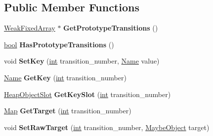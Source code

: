 \subsection*{Public Member Functions}
\begin{DoxyCompactItemize}
\item 
\mbox{\label{classv8_1_1internal_1_1TransitionArray_afcbf45c0f6c2a1c6b2a48971aad26eb3}} 
\mbox{\hyperlink{classv8_1_1internal_1_1WeakFixedArray}{Weak\+Fixed\+Array}} $\ast$ {\bfseries Get\+Prototype\+Transitions} ()
\item 
\mbox{\label{classv8_1_1internal_1_1TransitionArray_a60cda26d8a93728ff533ddd300ddc4d1}} 
\mbox{\hyperlink{classbool}{bool}} {\bfseries Has\+Prototype\+Transitions} ()
\item 
\mbox{\label{classv8_1_1internal_1_1TransitionArray_acc3e8763c63c29defd0416bc5c1ee091}} 
void {\bfseries Set\+Key} (\mbox{\hyperlink{classint}{int}} transition\+\_\+number, \mbox{\hyperlink{classv8_1_1internal_1_1Name}{Name}} value)
\item 
\mbox{\label{classv8_1_1internal_1_1TransitionArray_a8ce3e0c049ca13071923b592d588ba9b}} 
\mbox{\hyperlink{classv8_1_1internal_1_1Name}{Name}} {\bfseries Get\+Key} (\mbox{\hyperlink{classint}{int}} transition\+\_\+number)
\item 
\mbox{\label{classv8_1_1internal_1_1TransitionArray_a90202287bcd6a5cfbe62bc2b29fd39ba}} 
\mbox{\hyperlink{classv8_1_1internal_1_1HeapObjectSlot}{Heap\+Object\+Slot}} {\bfseries Get\+Key\+Slot} (\mbox{\hyperlink{classint}{int}} transition\+\_\+number)
\item 
\mbox{\label{classv8_1_1internal_1_1TransitionArray_abfa30ab06d02da7877ec38c1493379c4}} 
\mbox{\hyperlink{classv8_1_1internal_1_1Map}{Map}} {\bfseries Get\+Target} (\mbox{\hyperlink{classint}{int}} transition\+\_\+number)
\item 
\mbox{\label{classv8_1_1internal_1_1TransitionArray_a6173020fe2251bbce3116ff1f168341d}} 
void {\bfseries Set\+Raw\+Target} (\mbox{\hyperlink{classint}{int}} transition\+\_\+number, \mbox{\hyperlink{classv8_1_1internal_1_1MaybeObject}{Maybe\+Object}} target)

\end{DoxyCompactItemize}
